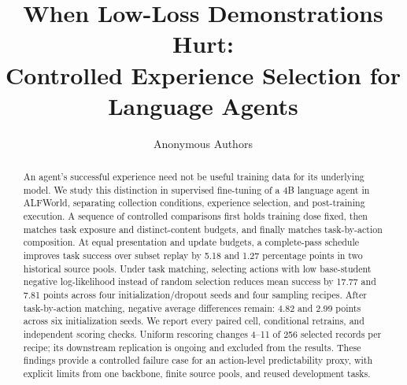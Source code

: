 \documentclass{article}
\title{When Low-Loss Demonstrations Hurt:\\Controlled Experience Selection for Language Agents}
\author{Anonymous Authors}
\date{}
\begin{document}
\raggedbottom
\maketitle
\begin{abstract}
An agent's successful experience need not be useful training data for its underlying model. We study this distinction in supervised fine-tuning of a 4B language agent in ALFWorld, separating collection conditions, experience selection, and post-training execution. A sequence of controlled comparisons first holds training dose fixed, then matches task exposure and distinct-content budgets, and finally matches task-by-action composition. At equal presentation and update budgets, a complete-pass schedule improves task success over subset replay by 5.18 and 1.27 percentage points in two historical source pools. Under task matching, selecting actions with low base-student negative log-likelihood instead of random selection reduces mean success by 17.77 and 7.81 points across four initialization/dropout seeds and four sampling recipes. After task-by-action matching, negative average differences remain: 4.82 and 2.99 points across six initialization seeds. We report every paired cell, conditional retrains, and independent scoring checks. Uniform rescoring changes 4--11 of 256 selected records per recipe; its downstream replication is ongoing and excluded from the results. These findings provide a controlled failure case for an action-level predictability proxy, with explicit limits from one backbone, finite source pools, and reused development tasks.
\end{abstract}








{\small}
\clearpage
\appendix

\end{document}
